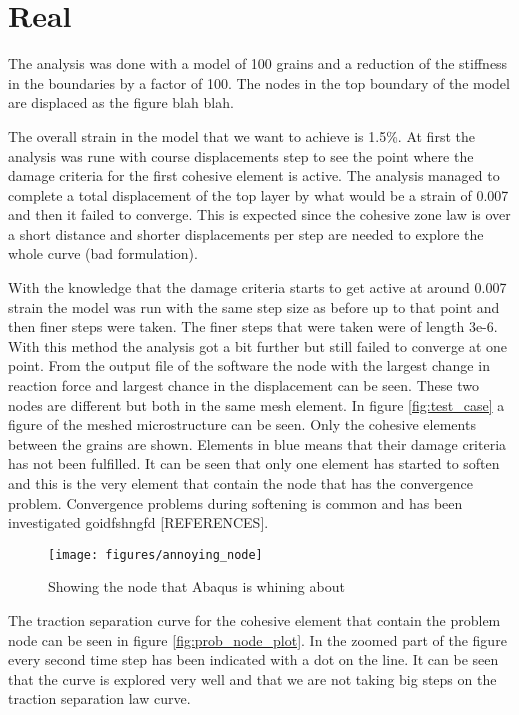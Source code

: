 \documentclass[convergence.tex]{subfiles}
\begin{document}
\section{Real}
The analysis was done with a model of 100 grains and a reduction of the stiffness in the boundaries by a factor of 100. The nodes in the top boundary of the model are displaced as the figure blah blah.

The overall strain in the model that we want to achieve is 1.5\%. At first the analysis was rune with course displacements step to see the point where the damage criteria for the first cohesive element is active. The analysis managed to complete a total displacement of the top layer by what would be a strain of 0.007 and then it failed to converge. This is expected since the cohesive zone law is over a short distance and shorter displacements per step are needed to explore the whole curve (bad formulation).

With the knowledge that the damage criteria starts to get active at around 0.007 strain the model was run with the same step size as before up to that point and then finer steps were taken. The finer steps that were taken were of length 3e-6. With this method the analysis got a bit further but still failed to converge at one point. From the output file of the software the node with the largest change in reaction force and largest chance in the displacement can be seen. These two nodes are different but both in the same mesh element. In figure \ref{fig:test_case} a figure of the meshed microstructure can be seen. Only the cohesive elements between the grains are shown. Elements in blue means that their damage criteria has not been fulfilled. It can be seen that only one element has started to soften and this is the very element that contain the node that has the convergence problem. Convergence problems during softening is common and has been investigated goidfshngfd [REFERENCES].

\begin{figure}[ht]
\centering
\texttt{[image: figures/annoying\_node]}
\caption{Showing the node that Abaqus is whining about}
\label{fig:annoying_node}
\end{figure}

The traction separation curve for the cohesive element that contain the problem node can be seen in figure \ref{fig:prob_node_plot}.  In the zoomed part of the figure every second time step has been indicated with a dot on the line. It can be seen that the curve is explored very well and that we are not taking big steps on the traction separation law curve. 
\end{document}
